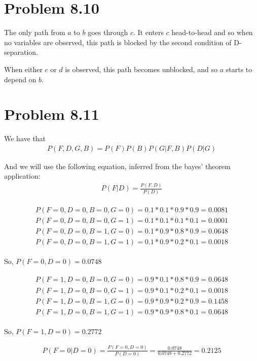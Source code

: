 \documentclass[fleqn]{article}
\begin{document}
\section*{Problem 8.10}

The only path from $a$ to $b$ goes through $c$. It enters $c$ head-to-head and so when no variables are observed, this path is blocked by the second condition of D-separation.

When either $c$ or $d$ is observed, this path becomes unblocked, and so $a$ starts to depend on $b$. 

\section*{Problem 8.11}
We have that
 \begin{align}
	P(F,D,G,B) = P(F)P(B)P(G|F,B)P(D|G)
\end{align}

And we will use the following equation, inferred from the bayes' theorem application:
\begin{align}
	P(F|D) = \frac{P(F,D)}{P(D)}
\end{align}

\begin{align}
\begin{split}
P(F=0,D=0,B=0,G=0) = 0.1 * 0.1 * 0.9 * 0.9 = 0.0081\\
P(F=0,D=0,B=0,G=1) = 0.1 * 0.1 * 0.1 * 0.1 = 0.0001\\
P(F=0,D=0,B=1,G=0) = 0.1 * 0.9 * 0.8 * 0.9 = 0.0648\\
P(F=0,D=0,B=1,G=1) = 0.1 * 0.9 * 0.2 * 0.1 = 0.0018
\end{split}
\end{align}

So, $P(F = 0,D = 0) = 0.0748$

\begin{align}
\begin{split}
	P(F=1,D=0,B=0,G=0) = 0.9 * 0.1 * 0.8 * 0.9 = 0.0648\\
	P(F=1,D=0,B=0,G=1) = 0.9 * 0.1 * 0.2 * 0.1 = 0.0018\\
	P(F=1,D=0,B=1,G=0) = 0.9 * 0.9 * 0.2 * 0.9 = 0.1458\\
	P(F=1,D=0,B=1,G=1) = 0.9 * 0.9 * 0.8 * 0.1 = 0.0648
\end{split}
\end{align}

So, $P(F = 1,D = 0) = 0.2772$

\begin{align}
P(F = 0|D=0) = \frac{P(F = 0, D = 0)}{P(D=0)} = \frac{0.0748}{0.0748 + 0.2772} = 0.2125
\end{align}
\end{document}
